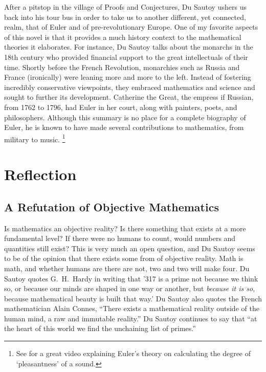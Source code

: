 \documentclass{mathbook}
\begin{document}
    After a pitstop in the village of Proofs and Conjectures, Du Sautoy ushers us back into his tour bus in order to take us to another different, yet connected, realm, that of Euler and of pre-revolutionary Europe. One of my favorite aspects of this novel is that it provides a much history context to the mathematical theories it elaborates. For instance, Du Sautoy talks about the monarchs in the 18th century who provided financial support to the great intellectuals of their time. Shortly before the French Revolution, monarchies such as Russia and France (ironically) were leaning more and more to the left. Instead of fostering incredibly conservative viewpoints, they embraced mathematics and science and sought to further its development. Catherine the Great, the empress if Russian, from 1762 to 1796, \cite{OldenbourgIdalie2020} had Euler in her court, along with painters, poets, and philosophers. \cite[pp.~41-42]{Sautoy2003} Although this summary is no place for a complete biography of Euler, he is known to have made several contributions to mathematics, from military to music. \footnote{See \cite{12tone2019} for a great video explaining Euler's theory on calculating the degree of `pleasantness' of a sound.}

    \section{Reflection}

    \subsection{A Refutation of Objective Mathematics}

    Is mathematics an objective reality? Is there something that exists at a more fundamental level? If there were no humans to count, would numbers and quantities still exist? This is very much an open question, and Du Sautoy seems to be of the opinion that there exists some from of objective reality. Math is math, and whether humans are there are not, two and two will make four. Du Sautoy quotes G.~H.~Hardy in writing that '317 is a prime not because we think so, or because our minds are shaped in one way or another, but \emph{because it is so}, because mathematical beauty is built that way.' Du Sautoy also quotes the French mathematician Alain Connes, ``There exists a mathematical reality outside of the human mind, a raw and immutable reality.'' Du Sautoy continues to say that ``at the heart of this world we find the unchaining list of primes.'' \cite[p.~7]{Sautoy2003}
\end{document}
